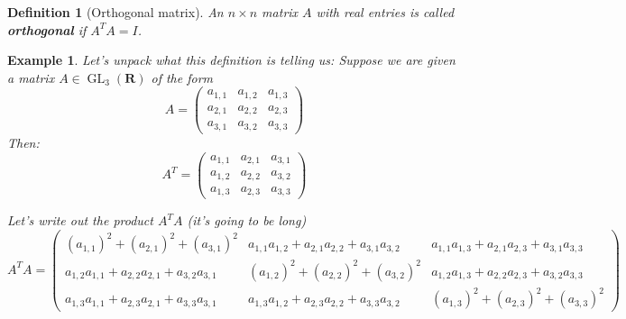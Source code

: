 \documentclass[12pt]{article}
\numberwithin{equation}{subsection}
\newtheorem{defn}[subsection]{Definition}
\theoremstyle{note}
\newtheorem{example}[subsection]{Example}
\newcommand{\GL}{\operatorname{GL}}
\begin{document}
\begin{defn}[Orthogonal matrix] An $n\times n$ matrix $A$ with real entries is called \textbf{orthogonal} if $A^TA=I$. 
\end{defn}

\begin{example}\label{orthogonal}
Let's unpack what this definition is telling us: Suppose we are given a matrix $A\in \GL_3(\mathbf{R})$ of the form \[A=\begin{pmatrix} a_{1,1} & a_{1,2} & a_{1,3} \\ a_{2,1} & a_{2,2} & a_{2,3} \\ a_{3,1} & a_{3,2} & a_{3,3} \end{pmatrix}\]
Then: 
 \[A^T=\begin{pmatrix} a_{1,1} & a_{2,1} & a_{3,1} \\ a_{1,2} & a_{2,2} & a_{3,2} \\ a_{1,3} & a_{2,3} & a_{3,3} \end{pmatrix}\]

Let's write out the product $A^TA$ (it's going to be long)
\begin{equation*} \label{Ex-A-orth}A^TA=
\begin{pmatrix} (a_{1,1})^2+(a_{2,1})^2+(a_{3,1})^2 & 
a_{1,1}a_{1,2} + a_{2,1}a_{2,2} + a_{3,1}a_{3,2} &
 a_{1,1}a_{1,3}+a_{2,1}a_{2,3}+a_{3,1}a_{3,3} \\
 a_{1,2}a_{1,1} +a_{2,2}a_{2,1}+a_{3,2}a_{3,1}& 
  (a_{1,2})^2+(a_{2,2})^2+(a_{3,2})^2 & 
  a_{1,2}a_{1,3}+a_{2,2}a_{2,3}+a_{3,2}a_{3,3} \\ 
  a_{1,3}a_{1,1}+a_{2,3}a_{2,1} + a_{3,3}a_{3,1} &
  a_{1,3}a_{1,2}+a_{2,3}a_{2,2}+a_{3,3}a_{3,2} & 
   (a_{1,3})^2+(a_{2,3})^2+(a_{3,3})^2\end{pmatrix}
\end{equation*}


\end{example}
\end{document}
